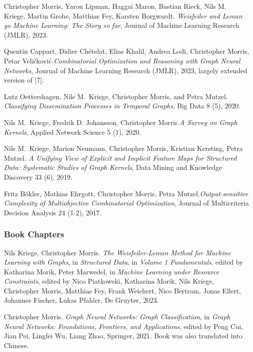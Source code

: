 \documentclass[11pt, a4paper, DIV=14, headings=small]{scrartcl}
\begin{document}
\begin{thebibliography}{15}
		Christopher Morris, Yaron Lipman, Haggai Maron, Bastian Rieck, Nils M. Kriege, Martin Grohe, Matthias Fey, Karsten Borgwardt.
		\emph{Weisfeiler and Leman go Machine Learning: The Story so far}, Journal of Machine Learning Research (JMLR), 2023.
		
		Quentin Cappart, Didier Chételat, Elias Khalil, Andrea Lodi, Christopher Morris, Petar Veli\v{c}kovi\'{c}.\footnotemark[2]
		\emph{Combinatorial Optimization and Reasoning with Graph Neural Networks},
		Journal of Machine Learning Research (JMLR), 2023, largely extended version of [7].
		
		Lutz Oettershagen, Nils M.~Kriege, Christopher Morris, and Petra Mutzel.
		\emph{Classifying Dissemination Processes in Temporal Graphs},
		Big Data 8 (5), 2020.
		
		Nils M.~Kriege,  Fredrik D. Johansson, Christopher Morris.\footnotemark[2]
		\emph{A Survey on Graph Kernels},
		Applied Network Science 5 (1), 2020.
		
		Nils M.~Kriege,  Marion Neumann, Christopher Morris, Kristian Kersting, Petra Mutzel.
		\emph{A Unifying View of Explicit and Implicit Feature Maps for Structured Data: Systematic Studies of Graph Kernels},
		Data Mining and Knowledge Discovery 33 (6), 2019.
		
		Fritz B\"okler, Mathias Ehrgott, Christopher Morris, Petra Mutzel.\footnotemark[1]
		\emph{Output-sensitive Complexity of Multiobjective Combinatorial Optimization},
		Journal of Multicriteria Decision Analysis 24 (1-2), 2017.
		
		\subsubsection*{Book Chapters}
		
		Nils Kriege, Christopher Morris.
		\emph{The Weisfeiler-Leman Method for Machine Learning with Graphs},
		in \emph{Structured Data}, in \emph{Volume 1 Fundamentals}, edited by Katharina Morik, Peter Marwedel, in \emph{Machine Learning under Resource Constraints},
		edited by Nico Piatkowski, Katharina Morik, Nils Kriege, Christopher Morris, Matthias Fey, Frank Weichert, Nico Bertram, Jonas Ellert, Johannes Fischer, Lukas Pfahler, De Gruyter, 2023.
		
		Christopher Morris.
		\emph{Graph Neural Networks: Graph Classification},
		in \emph{Graph Neural Networks: Foundations, Frontiers, and Applications}, edited by Peng Cui, Jian Pei, Lingfei Wu, Liang Zhao, Springer, 2021. Book was also translated into Chinese.
		

\end{thebibliography}
\end{document}
